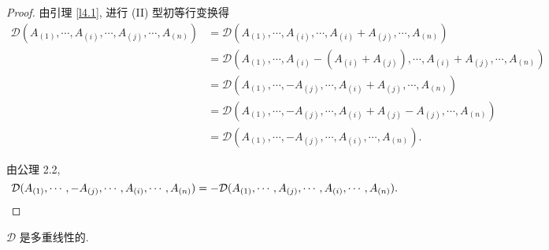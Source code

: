 \documentclass{ctexart}
\begin{document}
\begin{proof}
    由引理 \ref{l4.1}, 进行 (II) 型初等行变换得
    \begin{align*}
        \mathcal{D}(A_{(1)},\cdots,A_{(i)},\cdots,A_{(j)},\cdots,A_{(n)}) & =\mathcal{D}(A_{(1)},\cdots,A_{(i)},\cdots,A_{(i)}+A_{(j)},\cdots,A_{(n)}) \\
        & =\mathcal{D}(A_{(1)},\cdots,A_{(i)}-(A_{(i)}+A_{(j)}),\cdots,A_{(i)}+A_{(j)},\cdots,A_{(n)}) \\
        & =\mathcal{D}(A_{(1)},\cdots,-A_{(j)},\cdots,A_{(i)}+A_{(j)},\cdots,A_{(n)}) \\
        & =\mathcal{D}(A_{(1)},\cdots,-A_{(j)},\cdots,A_{(i)}+A_{(j)}-A_{(j)},\cdots,A_{(n)}) \\
        & =\mathcal{D}(A_{(1)},\cdots,-A_{(j)},\cdots,A_{(i)},\cdots,A_{(n)}).
    \end{align*}

    由公理 2.2,
    \[\mathcal{D}(A_{(1)},\cdots,-A_{(j)},\cdots,A_{(i)},\cdots,A_{(n)})=-\mathcal{D}(A_{(1)},\cdots,A_{(j)},\cdots,A_{(i)},\cdots,A_{(n)}).\qedhere\]
\end{proof}
\begin{theorem}[公理 1.2]
    $\mathcal{D}$ 是多重线性的.
\end{theorem}
\end{document}
